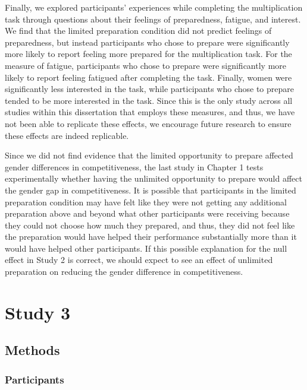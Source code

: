 \documentclass[a4paper, nobind]{templates/ociamthesis}
\begin{document}
Finally, we explored participants' experiences while completing the multiplication task through questions about their feelings of preparedness, fatigue, and interest. We find that the limited preparation condition did not predict feelings of preparedness, but instead participants who chose to prepare were significantly more likely to report feeling more prepared for the multiplication task. For the measure of fatigue, participants who chose to prepare were significantly more likely to report feeling fatigued after completing the task. Finally, women were significantly less interested in the task, while participants who chose to prepare tended to be more interested in the task. Since this is the only study across all studies within this dissertation that employs these measures, and thus, we have not been able to replicate these effects, we encourage future research to ensure these effects are indeed replicable.

Since we did not find evidence that the limited opportunity to prepare affected gender differences in competitiveness, the last study in Chapter 1 tests experimentally whether having the unlimited opportunity to prepare would affect the gender gap in competitiveness. It is possible that participants in the limited preparation condition may have felt like they were not getting any additional preparation above and beyond what other participants were receiving because they could not choose how much they prepared, and thus, they did not feel like the preparation would have helped their performance substantially more than it would have helped other participants. If this possible explanation for the null effect in Study 2 is correct, we should expect to see an effect of unlimited preparation on reducing the gender difference in competitiveness.

\hypertarget{study-3}{%
\section{Study 3}\label{study-3}}

\hypertarget{methods-2}{%
\subsection{Methods}\label{methods-2}}

\hypertarget{participants-2}{%
\subsubsection{Participants}\label{participants-2}}
\end{document}
